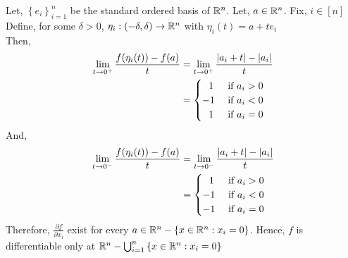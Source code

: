 \begin{soln}{1}
   Let, $ \left\{ e_i \right\}_{i=1}^n $ be the standard ordered basis of $ \mathbb{R}^n $. Let, $ a \in \mathbb{R}^n $. Fix, $ i \in [n] $  \\ 
   Define, for some $ \delta > 0 $, $ \eta_i : (-\delta,\delta) \to \mathbb{R}^n $ with $ \eta_i(t) = a+te_i$
  \\ 
  Then,
   \begin{align*}
    \lim_{t \to 0^+} \frac{f(\eta_i(t)) - f(a)}{t} 
    &= \lim_{t \to 0^+} \frac{\left| {a_i+t} \right| - \left| {a_i} \right|}{t} \\ 
    &= \begin{cases}
      \ \ 1 & \text{ if } a_i > 0  \\ 
      -1 & \text{ if } a_i < 0  \\ 
      \ \ 1 & \text{ if } a_i = 0
    \end{cases}
   \end{align*}
   And,
   \begin{align*}
    \lim_{t \to 0^-} \frac{f(\eta_i(t)) - f(a)}{t} 
    &= \lim_{t \to 0^-} \frac{\left| {a_i+t} \right| - \left| {a_i} \right|}{t} \\ 
    &= \begin{cases}
      \ \ 1 & \text{ if } a_i > 0  \\ 
      -1 & \text{ if } a_i < 0  \\ 
      -1 & \text{ if } a_i = 0
    \end{cases}
   \end{align*}
   Therefore, $ \frac{\partial f}{\partial x_i} $ exist for every $ a \in \mathbb{R}^n-\left\{ x \in \mathbb{R}^n : x_i = 0 \right\} $. Hence, $ f $ is differentiable only at $ \mathbb{R}^n-\bigcup_{i=1}^n \left\{ x \in \mathbb{R}^n : x_i = 0 \right\} $ 
\end{soln}